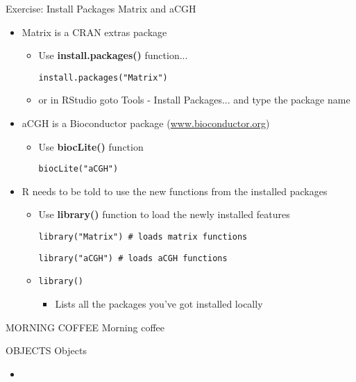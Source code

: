 \documentclass{beamer}
\begin{document}
\begin{frame}{Exercise: Install Packages Matrix and aCGH}
    \begin{itemize}
        \item Matrix is a CRAN extras package
        \begin{itemize}
            \item Use \textbf{install.packages()} function...
            \begin{verbatim}
install.packages("Matrix")\end{verbatim}
\item or in RStudio goto Tools - Install Packages... and type the package name
        \end{itemize}
        \item aCGH is a Bioconductor package (\url{www.bioconductor.org})
        \begin{itemize}
            \item Use \textbf{biocLite()} function
            \begin{verbatim}
biocLite("aCGH")\end{verbatim}
        \end{itemize}
        \item R needs to be told to use the new functions from the installed packages
        \begin{itemize}
            \item Use \textbf{library()} function to load the newly installed features
            \begin{verbatim}library("Matrix") # loads matrix functions\end{verbatim}
            \begin{verbatim}library("aCGH") # loads aCGH functions\end{verbatim}
            \item {\tt library()}
            \begin{itemize}
                \item Lists all the packages you've got installed locally
            \end{itemize}
        \end{itemize}
    \end{itemize}
\end{frame}

\begin{frame}{MORNING COFFEE}
Morning coffee
\end{frame}

\begin{frame}{OBJECTS}
Objects
\end{frame}



\begin{frame}{}
    \begin{itemize}
        \item
        \begin{verbatim}
        \end{verbatim}
    \end{itemize}
\end{frame}
\end{document}
